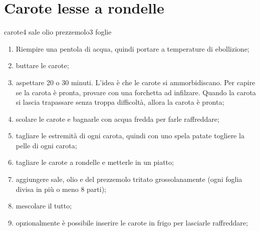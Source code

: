 \section{Carote lesse a rondelle}

\generalRecipeInfos{}

\ingredienti%
    {carote}{4}%
    {sale}{\qb{}}%
    {olio}{\qb{}}%
    {prezzemolo}{3 foglie}

\begin{enumerate}

    \item Riempire una pentola di acqua, quindi portare a temperature di ebollizione;
    \item buttare le carote;
    \item aspettare 20 o 30 minuti. L'idea è che le carote si ammorbidiscano. Per capire se la carota è pronta, provare con una forchetta ad infilzare. Quando la carota si lascia trapassare senza troppa difficoltà, allora la carota è pronta;
    \item scolare le carote e bagnarle con acqua fredda per farle raffreddare;
    \item tagliare le estremità di ogni carota, quindi con uno spela patate togliere la pelle di ogni carota;
    \item tagliare le carote a rondelle e metterle in un piatto;
    \item aggiungere sale, olio e del prezzemolo tritato grossolanamente (ogni foglia divisa in più o meno 8 parti);
    \item mescolare il tutto;

    \item opzionalmente è possibile inserire le carote in frigo per lasciarle raffreddare;
    
\end{enumerate}
